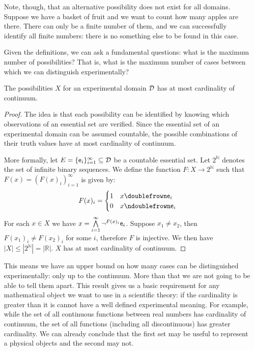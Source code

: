 \documentclass[11pt,letterpaper,fleqn]{memoir} %
\begin{document}
Note, though, that an alternative possibility does not exist for all domains. Suppose we have a basket of fruit and we want to count how many apples are there. There can only be a finite number of them, and we can successfully identify all finite numbers: there is no something else to be found in this case.

Given the definitions, we can ask a fundamental questions: what is the maximum number of possibilities? That is, what is the maximum number of cases between which we can distinguish experimentally?

\begin{mathSection}
	\begin{prop}
		The possibilities $X$ for an experimental domain $\edomain$ has at most cardinality of continuum.
	\end{prop}
	
	\begin{proof}
		The idea is that each possibility can be identified by knowing which observations of an essential set are verified. Since the essential set of an experimental domain can be assumed countable, the possible combinations of their truth values have at most cardinality of continuum.
		
		More formally, let $E = \{\obs[e]_i\}_{i=1}^{\infty} \subseteq \edomain$ be a countable essential set. Let $2^{\mathbb{N}}$ denotes the set of infinite binary sequences. We define the function $F:X\to2^{\mathbb{N}}$ such that $F(x) = (F(x)_i)_{i=1}^{\infty}$ is given by: 
		$$
		F(x)_i = 
		\begin{cases}
		1 & x \comp \obs[e]_i \\
		0 & x \ncomp \obs[e]_i
		\end{cases}
		$$
		For each $x \in X$ we have $x = \bigAND\limits_{i=1}^{\infty} \NOT^{F(x)_i} \obs[e]_i$. Suppose $x_1 \neq x_2$, then $F(x_1)_i \neq F(x_2)_i$ for some $i$, therefore $F$ is injective. We then have $|X| \leq |2^{\mathbb{N}}|=|\mathbb{R}|$. $X$ has at most cardinality of continuum.
	\end{proof}
\end{mathSection}

This means we have an upper bound on how many cases can be distinguished experimentally: only up to the continuum. More than that we are not going to be able to tell them apart. This result gives us a basic requirement for any mathematical object we want to use in a scientific theory: if the cardinality is greater than it is cannot have a well defined experimental meaning. For example, while the set of all continuous functions between real numbers has cardinality of continuum, the set of all functions (including all discontinuous) has greater cardinality. We can already conclude that the first set may be useful to represent a physical objects and the second may not.
\end{document}
